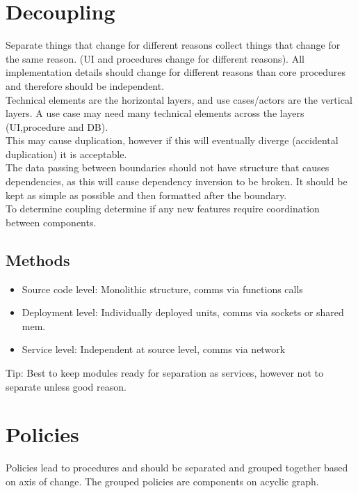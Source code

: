 \documentclass[11pt]{scrartcl} %
\begin{document}
\section{Decoupling}

Separate things that change for different reasons collect things that change for the same reason.
(UI and procedures change for different reasons). All implementation details should change for 
different reasons than core procedures and therefore should be independent.\\

Technical elements are the horizontal layers, and use cases/actors are the vertical layers. A use 
case may need many technical elements across the layers (UI,procedure and DB).\\

This may cause duplication, however if this will eventually diverge (accidental duplication) it is 
acceptable.\\

The data passing between boundaries should not have structure that causes dependencies, as this will
cause dependency inversion to be broken. It should be kept as simple as possible and then formatted
after the boundary.\\

To determine coupling determine if any new features require coordination between components.

\subsection{Methods}

\begin{itemize}
  \item Source code level: Monolithic structure, comms via functions calls
  \item Deployment level: Individually deployed units, comms via sockets or shared mem.
  \item Service level: Independent at source level, comms via network
\end{itemize}

Tip: Best to keep modules ready for separation as services, however not to separate unless good reason.

\section{Policies}

Policies lead to procedures and should be separated and grouped together based on axis of change.
The grouped policies are components on acyclic graph.
\end{document}
